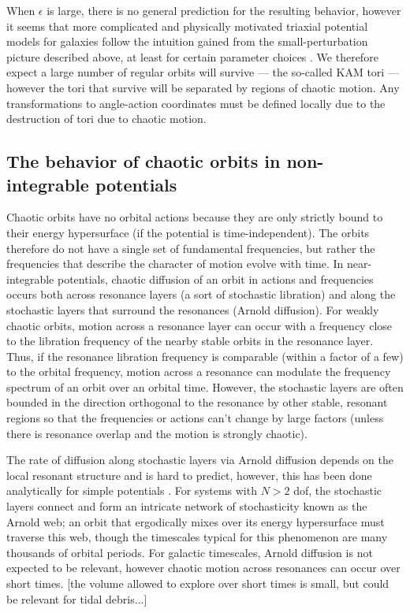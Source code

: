 \documentclass[letterpaper,12pt,preprint]{aastex}
\begin{document}
When $\epsilon$ is large, there is no general prediction for the resulting behavior, however it seems that more complicated and physically motivated triaxial potential models for galaxies follow the intuition gained from the small-perturbation picture described above, at least for certain parameter choices \citep{valluri, merritt, dehnen, etc.}. We therefore expect a large number of regular orbits will survive --- the so-called KAM tori --- however the tori that survive will be separated by regions of chaotic motion. Any transformations to angle-action coordinates must be defined locally due to the destruction of tori due to chaotic motion. 

\subsection{The behavior of chaotic orbits in non-integrable potentials}\label{sec:behavior-chaotic}

Chaotic orbits have no orbital actions because they are only strictly bound to their energy hypersurface (if the potential is time-independent). The orbits therefore do not have a single set of fundamental frequencies, but rather the frequencies that describe the character of motion evolve with time. In near-integrable potentials, chaotic diffusion of an orbit in actions and frequencies occurs both across resonance layers (a sort of stochastic libration) and along the stochastic layers that surround the resonances (Arnold diffusion). For weakly chaotic orbits, motion across a resonance layer can occur with a frequency close to the libration frequency of the nearby stable orbits in the resonance layer. Thus, if the resonance libration frequency is comparable (within a factor of a few) to the orbital frequency, motion across a resonance can modulate the frequency spectrum of an orbit over an orbital time. However, the stochastic layers are often bounded in the direction orthogonal to the resonance by other stable, resonant regions so that the frequencies or actions can't change by large factors (unless there is resonance overlap and the motion is strongly chaotic). 

The rate of diffusion along stochastic layers via Arnold diffusion depends on the local resonant structure and is hard to predict, however, this has been done analytically for simple potentials \citep[e.g.,][]{chirikov??}. For systems with $N>2$ dof, the stochastic layers connect and form an intricate network of stochasticity known as the Arnold web; an orbit that ergodically mixes over its energy hypersurface must traverse this web, though the timescales typical for this phenomenon are many thousands of orbital periods. For galactic timescales, Arnold diffusion is not expected to be relevant, however chaotic motion across resonances can occur over short times. [the volume allowed to explore over short times is small, but could be relevant for tidal debris...]
\end{document}
